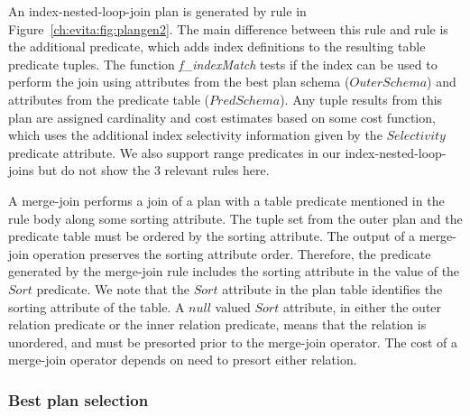 An index-nested-loop-join plan is generated by rule  in Figure~\ref{ch:evita:fig:plangen2}. The main
difference between this rule and rule  is the additional  predicate, which
adds index definitions to the resulting table predicate tuples. The function {\em f\_indexMatch}
tests if the index can be used to perform the join using attributes from the best plan schema ($OuterSchema$)
and attributes from the predicate table ($PredSchema$). Any tuple results from this plan are assigned 
cardinality and cost estimates based on some cost function, which uses the additional index selectivity
information given by the $Selectivity$  predicate attribute.
We also support range predicates in our index-nested-loop-joins but do
not show the 3 relevant rules here.

A merge-join performs a join of a plan with a table predicate mentioned in the rule body along
some sorting attribute. The tuple set from the outer plan and the predicate table must
be ordered by the sorting attribute. The output of a merge-join operation preserves
the sorting attribute order. Therefore, the  predicate generated by the merge-join rule 
includes the sorting attribute in the value of the $Sort$  predicate. We note that the $Sort$
attribute in the  plan table identifies the sorting attribute of the table.
A $null$ valued $Sort$ attribute, in either the outer relation  predicate or the inner relation
 predicate, means that the relation is unordered, and must be presorted prior to the merge-join operator.  
The cost of a merge-join operator depends on need to presort either relation. 

\subsubsection{Best plan selection}
\label{ch:evita:sec:bestplan}

